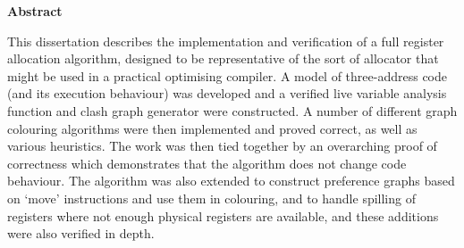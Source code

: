 \newpage
{\Huge \bf Abstract}
\vspace{24pt} 


This dissertation describes the implementation and verification of a full register allocation algorithm, designed to be representative of the sort of allocator that might be used in a practical optimising compiler. A model of three-address code (and its execution behaviour) was developed and a verified live variable analysis function and clash graph generator were constructed. A number of different graph colouring algorithms were then implemented and proved correct, as well as various heuristics. The work was then tied together by an overarching proof of correctness which demonstrates that the algorithm does not change code behaviour. The algorithm was also extended to construct preference graphs based on `move' instructions and use them in colouring, and to handle spilling of registers where not enough physical registers are available, and these additions were also verified in depth.


\newpage
\vspace*{\fill}
